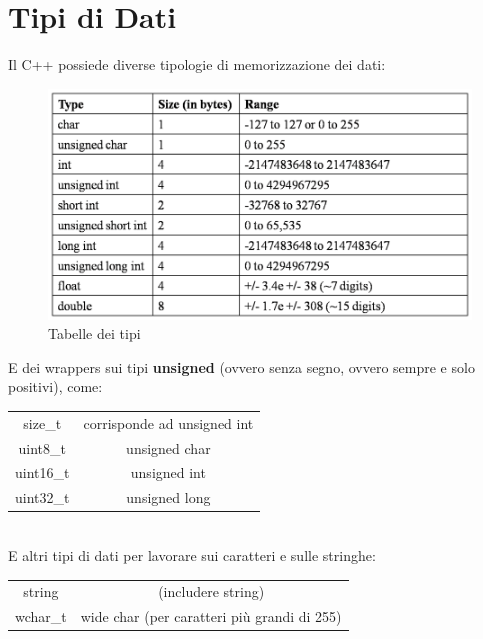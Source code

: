 
\newpage

\section{Tipi di Dati}


\textsf{\small Il C++ possiede diverse tipologie di memorizzazione dei dati: }\\

\begin{figure}[ht]
	\centering
	\includegraphics[width=1\textwidth, height=1\textheight, keepaspectratio]{./imgs/data_types_table.png}
	\caption{Tabelle dei tipi}
	\label{fig:data_types}
\end{figure}

\textsf{\small E dei wrappers sui tipi \textbf{unsigned} (ovvero senza segno, ovvero sempre e solo positivi), come: }\\

\begin{tabular}{cc}
	\color{myblue2}size\_t & corrisponde ad unsigned int \\
	\color{myblue2}uint8\_t & unsigned char \\
	\color{myblue2}uint16\_t & unsigned int  \\
	\color{myblue2}uint32\_t & unsigned long \\ 
\end{tabular} \\

\textsf{\small E altri tipi di dati per lavorare sui caratteri e sulle stringhe: }\\

\begin{tabular}{cc}
	\color{myblue2}string & (includere string) \\
	\color{myblue2}wchar\_t & wide char (per caratteri più grandi di 255) \\
\end{tabular}

